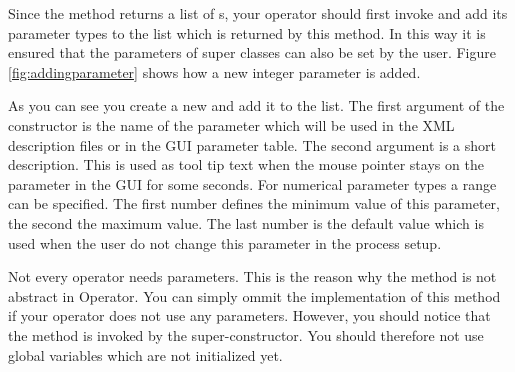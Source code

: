 Since the method  returns a list of s, your operator should
first invoke  and add its parameter types to
the list which is returned by this method. In this way it is ensured that the
parameters of super classes can also be set by the user. Figure
\ref{fig:addingparameter} shows how a new integer parameter is added.


As you can see you create a new  and add it to the
list. The first argument of the constructor is the name of the parameter which
will be used in the XML description files or in the GUI parameter
table. The second argument is a short description. This is used as tool tip
text when the mouse pointer stays on the parameter in the GUI for some seconds. For numerical
parameter types a range can be specified. The first number defines the minimum
value of this parameter, the second the maximum value. The last number is the
default value which is used when the user do not change this parameter in the
process setup.

Not every operator needs parameters. This is the reason why the method
 is not abstract in Operator. You can simply ommit
the implementation of this method if your operator does not use any
parameters. However, you should notice that the method
 is invoked by the super-constructor. You should
therefore not use global variables which are not initialized yet.


